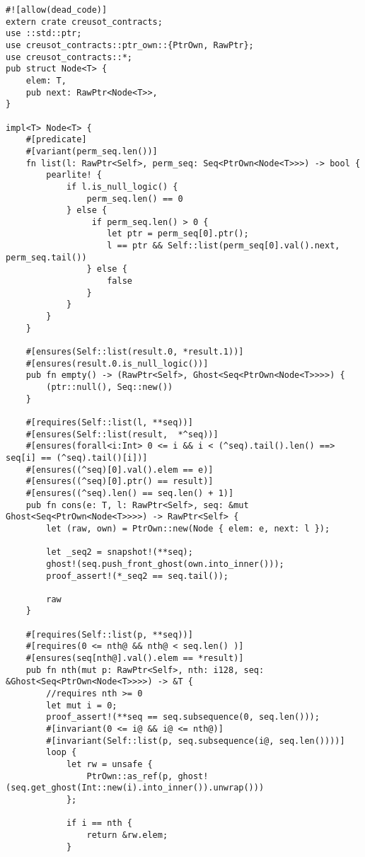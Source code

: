 \begin{verbatim}
#![allow(dead_code)]
extern crate creusot_contracts;
use ::std::ptr;
use creusot_contracts::ptr_own::{PtrOwn, RawPtr};
use creusot_contracts::*;
pub struct Node<T> {
    elem: T,
    pub next: RawPtr<Node<T>>,
}

impl<T> Node<T> {
    #[predicate]
    #[variant(perm_seq.len())]
    fn list(l: RawPtr<Self>, perm_seq: Seq<PtrOwn<Node<T>>>) -> bool {
        pearlite! {
            if l.is_null_logic() {
                perm_seq.len() == 0
            } else {
                 if perm_seq.len() > 0 {
                    let ptr = perm_seq[0].ptr();
                    l == ptr && Self::list(perm_seq[0].val().next, perm_seq.tail())
                } else {
                    false
                }
            }
        }
    }

    #[ensures(Self::list(result.0, *result.1))]
    #[ensures(result.0.is_null_logic())]
    pub fn empty() -> (RawPtr<Self>, Ghost<Seq<PtrOwn<Node<T>>>>) {
        (ptr::null(), Seq::new())
    }

    #[requires(Self::list(l, **seq))]
    #[ensures(Self::list(result,  *^seq))]
    #[ensures(forall<i:Int> 0 <= i && i < (^seq).tail().len() ==> seq[i] == (^seq).tail()[i])]
    #[ensures((^seq)[0].val().elem == e)]
    #[ensures((^seq)[0].ptr() == result)]
    #[ensures((^seq).len() == seq.len() + 1)]
    pub fn cons(e: T, l: RawPtr<Self>, seq: &mut Ghost<Seq<PtrOwn<Node<T>>>>) -> RawPtr<Self> {
        let (raw, own) = PtrOwn::new(Node { elem: e, next: l });

        let _seq2 = snapshot!(**seq);
        ghost!(seq.push_front_ghost(own.into_inner()));
        proof_assert!(*_seq2 == seq.tail());

        raw
    }

    #[requires(Self::list(p, **seq))]
    #[requires(0 <= nth@ && nth@ < seq.len() )]
    #[ensures(seq[nth@].val().elem == *result)]
    pub fn nth(mut p: RawPtr<Self>, nth: i128, seq: &Ghost<Seq<PtrOwn<Node<T>>>>) -> &T {
        //requires nth >= 0
        let mut i = 0;
        proof_assert!(**seq == seq.subsequence(0, seq.len()));
        #[invariant(0 <= i@ && i@ <= nth@)]
        #[invariant(Self::list(p, seq.subsequence(i@, seq.len())))]
        loop {
            let rw = unsafe {
                PtrOwn::as_ref(p, ghost!(seq.get_ghost(Int::new(i).into_inner()).unwrap()))
            };

            if i == nth {
                return &rw.elem;
            }


\end{verbatim}
